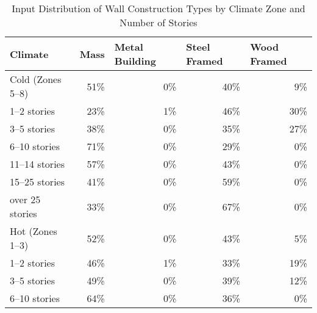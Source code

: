 \begin{table}
\small
\centering
\caption[Wall Construction Types]{Input Distribution of Wall Construction Types by Climate Zone and Number of Stories}
\label{tab:wall_constuction_types}
\begin{tabular}{lrrrr}
\textbf{Climate}          & \multicolumn{1}{l}{\textbf{Mass}} & \multicolumn{1}{l}{\textbf{Metal Building}} & \multicolumn{1}{l}{\textbf{Steel Framed}} & \multicolumn{1}{l}{\textbf{Wood Framed}}  \\ \hline
Cold (Zones 5--8) & 51\%                     & 0\%                                & 40\%                             & 9\%                              \\ \hline
1--2 stories      & 23\%                     & 1\%                                & 46\%                             & 30\%                             \\
3--5 stories      & 38\%                     & 0\%                                & 35\%                             & 27\%                             \\
6--10 stories     & 71\%                     & 0\%                                & 29\%                             & 0\%                              \\
11--14 stories    & 57\%                     & 0\%                                & 43\%                             & 0\%                              \\
15--25 stories    & 41\%                     & 0\%                                & 59\%                             & 0\%                              \\
over 25 stories  & 33\%                     & 0\%                                & 67\%                             & 0\%                              \\ \hline
Hot (Zones 1--3)  & 52\%                     & 0\%                                & 43\%                             & 5\%                              \\ \hline 
1--2 stories      & 46\%                     & 1\%                                & 33\%                             & 19\%                             \\
3--5 stories      & 49\%                     & 0\%                                & 39\%                             & 12\%                             \\
6--10 stories     & 64\%                     & 0\%                                & 36\%                             & 0\%                              \\

\end{tabular}
\end{table}
